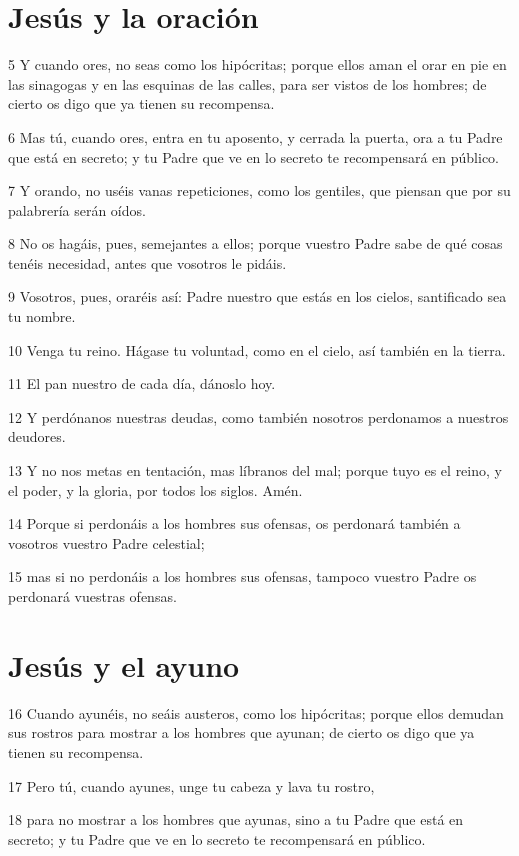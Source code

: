 \section*{Jesús y la oración}

\par 5 Y cuando ores, no seas como los hipócritas; porque ellos aman el orar en pie en las sinagogas y en las esquinas de las calles, para ser vistos de los hombres; de cierto os digo que ya tienen su recompensa.
\par 6 Mas tú, cuando ores, entra en tu aposento, y cerrada la puerta, ora a tu Padre que está en secreto; y tu Padre que ve en lo secreto te recompensará en público.
\par 7 Y orando, no uséis vanas repeticiones, como los gentiles, que piensan que por su palabrería serán oídos.
\par 8 No os hagáis, pues, semejantes a ellos; porque vuestro Padre sabe de qué cosas tenéis necesidad, antes que vosotros le pidáis.
\par 9 Vosotros, pues, oraréis así: Padre nuestro que estás en los cielos, santificado sea tu nombre.
\par 10 Venga tu reino. Hágase tu voluntad, como en el cielo, así también en la tierra.
\par 11 El pan nuestro de cada día, dánoslo hoy.
\par 12 Y perdónanos nuestras deudas, como también nosotros perdonamos a nuestros deudores.
\par 13 Y no nos metas en tentación, mas líbranos del mal; porque tuyo es el reino, y el poder, y la gloria, por todos los siglos. Amén.
\par 14 Porque si perdonáis a los hombres sus ofensas, os perdonará también a vosotros vuestro Padre celestial;
\par 15 mas si no perdonáis a los hombres sus ofensas, tampoco vuestro Padre os perdonará vuestras ofensas.

\section*{Jesús y el ayuno}

\par 16 Cuando ayunéis, no seáis austeros, como los hipócritas; porque ellos demudan sus rostros para mostrar a los hombres que ayunan; de cierto os digo que ya tienen su recompensa.
\par 17 Pero tú, cuando ayunes, unge tu cabeza y lava tu rostro,
\par 18 para no mostrar a los hombres que ayunas, sino a tu Padre que está en secreto; y tu Padre que ve en lo secreto te recompensará en público.

